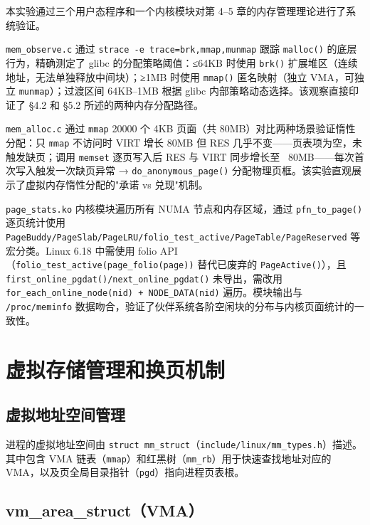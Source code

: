 \documentclass[a4paper]{article}
\begin{document}
本实验通过三个用户态程序和一个内核模块对第 4–5 章的内存管理理论进行了系统验证。

\texttt{mem\_observe.c} 通过 \texttt{strace -e trace=brk,mmap,munmap} 跟踪 \texttt{malloc()} 的底层行为，精确测定了 glibc 的分配策略阈值：≤64KB 时使用 \texttt{brk()} 扩展堆区（连续地址，无法单独释放中间块）；≥1MB 时使用 \texttt{mmap()} 匿名映射（独立 VMA，可独立 \texttt{munmap}）；过渡区间 64KB–1MB 根据 glibc 内部策略动态选择。该观察直接印证了 §4.2 和 §5.2 所述的两种内存分配路径。

\texttt{mem\_alloc.c} 通过 \texttt{mmap} 20000 个 4KB 页面（共 80MB）对比两种场景验证惰性分配：只 \texttt{mmap} 不访问时 VIRT 增长 80MB 但 RES 几乎不变——页表项为空，未触发缺页；调用 \texttt{memset} 逐页写入后 RES 与 VIRT 同步增长至 ~80MB——每次首次写入触发一次缺页异常 → \texttt{do\_anonymous\_page()} 分配物理页框。该实验直观展示了虚拟内存惰性分配的"承诺 vs 兑现"机制。

\texttt{page\_stats.ko} 内核模块遍历所有 NUMA 节点和内存区域，通过 \texttt{pfn\_to\_page()} 逐页统计使用 \texttt{PageBuddy/PageSlab/PageLRU/folio\_test\_active/PageTable/PageReserved} 等宏分类。Linux 6.18 中需使用 folio API（\texttt{folio\_test\_active(page\_folio(page))} 替代已废弃的 \texttt{PageActive()}），且 \texttt{first\_online\_pgdat()/next\_online\_pgdat()} 未导出，需改用 \texttt{for\_each\_online\_node(nid) + NODE\_DATA(nid)} 遍历。模块输出与 \texttt{/proc/meminfo} 数据吻合，验证了伙伴系统各阶空闲块的分布与内核页面统计的一致性。

\section{虚拟存储管理和换页机制} \label{sec:ch5}

\subsection{虚拟地址空间管理}

进程的虚拟地址空间由 \texttt{struct mm\_struct}（\texttt{include/linux/mm\_types.h}）描述\cite{bovet,gorman}。其中包含 VMA 链表（\texttt{mmap}）和红黑树（\texttt{mm\_rb}）用于快速查找地址对应的 VMA，以及页全局目录指针（\texttt{pgd}）指向进程页表根。

\subsection{vm\_area\_struct（VMA）}
\end{document}
